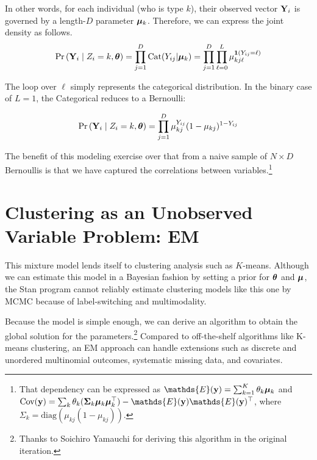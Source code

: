 \documentclass[11pt]{article}
\begin{document}
In other words, for each individual (who is  type \(k\)), their observed vector \(\mathbf{Y}_{i}\) is governed by a length-\(D\) parameter \(\bm{\mu}_{k}\). Therefore, we can express the joint density as follows. 
\begin{align}
\mathbb{\Pr}\left(\mathbf{Y}_{i} \mid Z_{i} = k, \bm{\theta}\right) = \prod^{D}_{j = 1} \text{Cat}(Y_{ij} | \bm{\mu}_k) = \prod^{D}_{j = 1}\prod^{L}_{\ell=0} \mu_{kj\ell}^{\bm{1}\left(Y_{ij} = \ell\right)}
\end{align}

The loop over \(\ell\) simply represents the categorical distribution. In the binary case of \(L = 1\), the Categorical reduces to a Bernoulli:

\begin{align}
\mathbb{\Pr}\left(\mathbf{Y}_{i} \mid Z_{i} = k, \bm{\theta}\right) = \prod^{D}_{j=1}\mu_{kj}^{Y_{ij}}(1 - \mu_{kj})^{1- Y_{ij}}\nonumber
\end{align}




The benefit of this modeling exercise over that from a naive sample of
\(N \times D\) Bernoullis is that we have captured the correlations
between variables.\footnote{That dependency can be expressed as \(\mathds{E}(\by) = \sum_{k = 1}^{K} \theta_{k} \bmu_{k}\) and 
\(\cov({\by}) = \sum_{k} \theta_{k} (\mathbf{\Sigma}_k \bmu_k\bmu_{k}^{\top}) - \mathds{E}(\by)\mathds{E}(\by)^\top\), where \(\Sigma_k = \text{diag}(\mu_{kj}(1 - \mu_{kj}))\).}


\section{Clustering as an Unobserved Variable Problem: EM}

This mixture model lends itself to clustering analysis such as \(K\)-means. Although we can estimate this model in a Bayesian fashion by setting a prior for \(\bm{\theta}\) and \(\bm{\mu}\), the \textsf{Stan} program cannot reliably estimate clustering models like this one by MCMC because of label-switching and multimodality. 

Because the model is simple enough, we can derive an algorithm to obtain the global solution for the parameters.\footnote{Thanks to Soichiro Yamauchi for deriving this algorithm in the original iteration.} Compared to off-the-shelf algorithms like K-means clustering, an EM approach can handle extensions such as discrete and unordered multinomial outcomes, systematic missing data, and covariates. 
\end{document}
